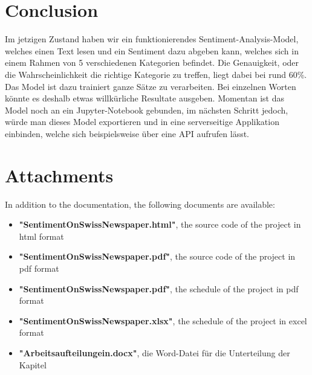 \section{Conclusion}
Im jetzigen Zustand haben wir ein funktionierendes Sentiment-Analysis-Model, welches einen Text lesen und ein Sentiment dazu abgeben kann, welches sich in einem Rahmen von 5 verschiedenen Kategorien befindet. Die Genauigkeit, oder die Wahrscheinlichkeit die richtige Kategorie zu treffen, liegt dabei bei rund 60\%. Das Model ist dazu trainiert ganze Sätze zu verarbeiten. Bei einzelnen Worten könnte es deshalb etwas willkürliche Resultate ausgeben. Momentan ist das Model noch an ein Jupyter-Notebook gebunden, im nächsten Schritt jedoch, würde man dieses Model exportieren und in eine serverseitige Applikation einbinden, welche sich beispielsweise über eine API aufrufen lässt.

\section{Attachments}
In addition to the documentation, the following documents are available:
\begin{itemize}
    \item \textbf{"SentimentOnSwissNewspaper.html"}, the source code of the project in html format
    \item \textbf{"SentimentOnSwissNewspaper.pdf"}, the source code of the project in pdf format
    \item \textbf{"SentimentOnSwissNewspaper.pdf"}, the schedule of the project in pdf format
    \item \textbf{"SentimentOnSwissNewspaper.xlsx"}, the schedule of the project in excel format
    \item \textbf{"Arbeitsaufteilungein.docx"}, die Word-Datei für die Unterteilung der Kapitel
\end{itemize}

